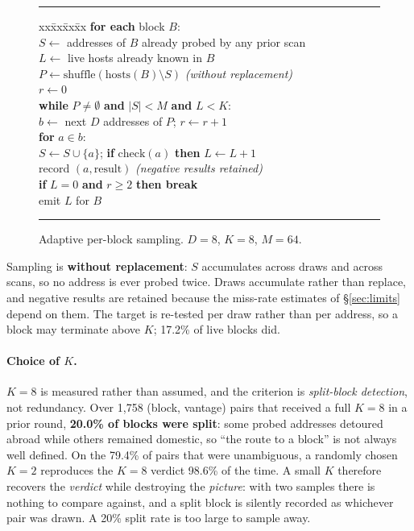 \begin{figure}[t]
\small
\hrule\vspace{4pt}
\begin{tabbing}
xx\=xx\=xx\=xx\kill
\textbf{for each} block $B$: \\
\> $S \leftarrow$ addresses of $B$ already probed by any prior scan \\
\> $L \leftarrow$ live hosts already known in $B$ \\
\> $P \leftarrow \mathrm{shuffle}\!\left(\mathrm{hosts}(B) \setminus S\right)$
   \quad \textit{(without replacement)} \\
\> $r \leftarrow 0$ \\
\> \textbf{while} $P \neq \emptyset$ \textbf{and} $|S| < M$ \textbf{and} $L < K$: \\
\> \> $b \leftarrow$ next $D$ addresses of $P$; \quad $r \leftarrow r+1$ \\
\> \> \textbf{for} $a \in b$: \\
\> \> \> $S \leftarrow S \cup \{a\}$;\quad
        \textbf{if} $\mathrm{check}(a)$ \textbf{then} $L \leftarrow L+1$ \\
\> \> \> record $(a, \mathrm{result})$ \quad \textit{(negative results retained)} \\
\> \> \textbf{if} $L = 0$ \textbf{and} $r \geq 2$ \textbf{then break} \\
\> emit $L$ for $B$
\end{tabbing}
\vspace{2pt}\hrule
\caption{Adaptive per-block sampling. $D=8$, $K=8$, $M=64$.}
\label{alg:sample}
\end{figure}

Sampling is \textbf{without replacement}: $S$ accumulates across draws and across scans,
so no address is ever probed twice. Draws accumulate rather than replace, and negative
results are retained because the miss-rate estimates of \S\ref{sec:limits} depend on them.
The target is re-tested per draw rather than per address, so a block may terminate above
$K$; 17.2\% of live blocks did.

\paragraph{Choice of $K$.} $K=8$ is measured rather than assumed, and the criterion is
\emph{split-block detection}, not redundancy. Over 1{,}758 (block, vantage) pairs that
received a full $K=8$ in a prior round, \textbf{20.0\% of blocks were split}: some probed
addresses detoured abroad while others remained domestic, so ``the route to a block'' is
not always well defined. On the 79.4\% of pairs that were unambiguous, a randomly chosen
$K=2$ reproduces the $K=8$ verdict 98.6\% of the time. A small $K$ therefore recovers the
\emph{verdict} while destroying the \emph{picture}: with two samples there is nothing to
compare against, and a split block is silently recorded as whichever pair was drawn. A
20\% split rate is too large to sample away.

